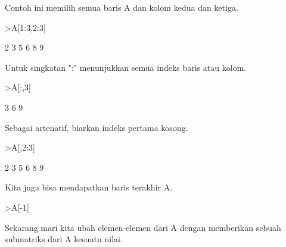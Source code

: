 \documentclass[a4paper,10pt]{article}
\begin{document}
\begin{eulernotebook}
\begin{eulercomment}
\begin{eulercomment}
\begin{eulercomment}
\begin{eulercomment}
\begin{eulercomment}
Contoh ini memilih semua baris A dan kolom kedua dan ketiga.
\end{eulercomment}
\begin{eulerprompt}
>A[1:3,2:3]
\end{eulerprompt}
\begin{euleroutput}
              2             3 
              5             6 
              8             9 
\end{euleroutput}
\begin{eulercomment}
Untuk singkatan ":" menunjukkan semua indeks baris atau kolom.
\end{eulercomment}
\begin{eulerprompt}
>A[:,3]
\end{eulerprompt}
\begin{euleroutput}
              3 
              6 
              9 
\end{euleroutput}
\begin{eulercomment}
Sebagai artenatif, biarkan indeks pertama kosong.
\end{eulercomment}
\begin{eulerprompt}
>A[,2:3]
\end{eulerprompt}
\begin{euleroutput}
              2             3 
              5             6 
              8             9 
\end{euleroutput}
\begin{eulercomment}
Kita juga bisa mendapatkan baris terakhir A.
\end{eulercomment}
\begin{eulerprompt}
>A[-1]
\end{eulerprompt}
\begin{euleroutput}
  [7,  8,  9]
\end{euleroutput}
\begin{eulercomment}
Sekarang mari kita ubah elemen-elemen dari A dengan memberikan sebuah
submatriks dari A kesuatu nilai.


\end{eulercomment}
\end{eulercomment}
\end{eulercomment}
\end{eulercomment}
\end{eulercomment}
\end{eulernotebook}
\end{document}
